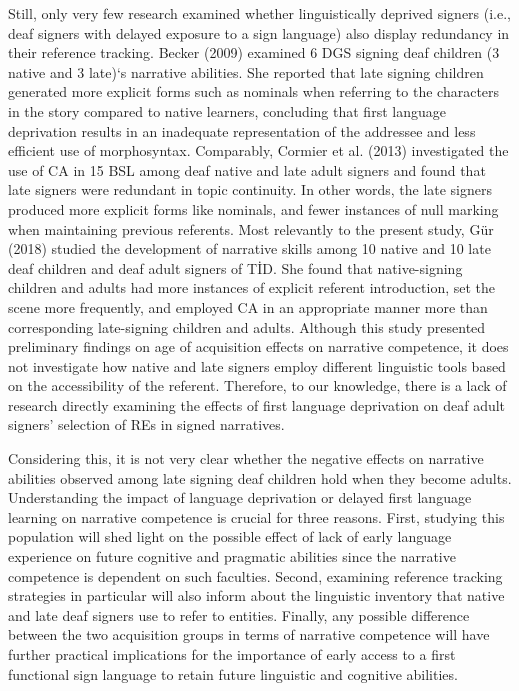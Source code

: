 \documentclass[]{elsarticle} %
\begin{document}
Still, only very few research examined whether linguistically deprived
signers (i.e., deaf signers with delayed exposure to a sign language)
also display redundancy in their reference tracking. Becker (2009)
examined 6 DGS signing deaf children (3 native and 3 late)`s narrative
abilities. She reported that late signing children generated more
explicit forms such as nominals when referring to the characters in the
story compared to native learners, concluding that first language
deprivation results in an inadequate representation of the addressee and
less efficient use of morphosyntax. Comparably, Cormier et al. (2013)
investigated the use of CA in 15 BSL among deaf native and late adult
signers and found that late signers were redundant in topic continuity.
In other words, the late signers produced more explicit forms like
nominals, and fewer instances of null marking when maintaining previous
referents. Most relevantly to the present study, Gür (2018) studied the
development of narrative skills among 10 native and 10 late deaf
children and deaf adult signers of TİD. She found that native-signing
children and adults had more instances of explicit referent
introduction, set the scene more frequently, and employed CA in an
appropriate manner more than corresponding late-signing children and
adults. Although this study presented preliminary findings on age of
acquisition effects on narrative competence, it does not investigate how
native and late signers employ different linguistic tools based on the
accessibility of the referent. Therefore, to our knowledge, there is a
lack of research directly examining the effects of first language
deprivation on deaf adult signers' selection of REs in signed
narratives.

Considering this, it is not very clear whether the negative effects on
narrative abilities observed among late signing deaf children hold when
they become adults. Understanding the impact of language deprivation or
delayed first language learning on narrative competence is crucial for
three reasons. First, studying this population will shed light on the
possible effect of lack of early language experience on future cognitive
and pragmatic abilities since the narrative competence is dependent on
such faculties. Second, examining reference tracking strategies in
particular will also inform about the linguistic inventory that native
and late deaf signers use to refer to entities. Finally, any possible
difference between the two acquisition groups in terms of narrative
competence will have further practical implications for the importance
of early access to a first functional sign language to retain future
linguistic and cognitive abilities.
\end{document}
